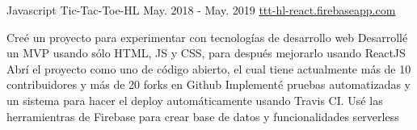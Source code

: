 \begin{cventries}

  \cventry
    {Javascript}
    {Tic-Tac-Toe-HL} %
    {May. 2018 - May. 2019} %
    {\url{ttt-hl-react.firebaseapp.com}} %
    {
      \begin{cvitems} %
         {{
          Creé un proyecto para experimentar con tecnologías de desarrollo web
        }}
         {{
          Desarrollé un MVP usando sólo HTML, JS y CSS, para después mejorarlo usando ReactJS
        }}
         {{
          Abrí el proyecto como uno de código abierto, el cual tiene actualmente más de 10 contribuidores y más de 20 forks en Github
        }}
         {{
          Implementé pruebas automatizadas y un sistema para hacer el deploy automáticamente usando Travis CI.
        }}
         {{
          Usé las herramientras de Firebase para crear base de datos y funcionalidades serverless
        }}
      \end{cvitems}
    }


\end{cventries}
